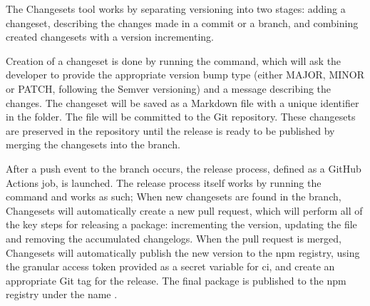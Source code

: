 The Changesets tool works by separating versioning into two stages: adding a changeset, describing the changes made in a commit or a branch, and combining created changesets with a version incrementing.

Creation of a changeset is done by running the  command, which will ask the developer to provide the appropriate version bump type (either MAJOR, MINOR or PATCH, following the Semver versioning) and a message describing the changes. The changeset will be saved as a Markdown file with a unique identifier in the  folder. The file will be committed to the Git repository. These changesets are preserved in the repository until the release is ready to be published by merging the changesets into the  branch.

After a push event to the  branch occurs, the release process, defined as a GitHub Actions job, is launched. The release process itself works by running the  command and works as such; When new changesets are found in the  branch, Changesets will automatically create a new pull request, which will perform all of the key steps for releasing a package: incrementing the version, updating the  file and removing the accumulated changelogs. When the pull request is merged, Changesets will automatically publish the new version to the \acrshort{npm} registry, using the granular access token provided as a secret variable for \acrshort{ci}, and create an appropriate Git tag for the release. The final package is published to the \acrshort{npm} registry under the name  \cite{Tsmathevaluate2023}. 